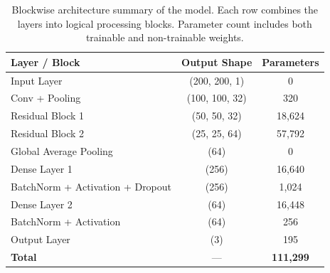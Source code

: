 \begin{table}[H]
\centering
\scriptsize
\begin{tabular}{lcc}
    \toprule
    \textbf{Layer / Block} & \textbf{Output Shape} & \textbf{Parameters} \\
    \midrule
    Input Layer                     & (200, 200, 1)     & 0 \\
    Conv + Pooling                      & (100, 100, 32)    & 320 \\
    Residual Block 1               & (50, 50, 32)      & 18,624 \\
    Residual Block 2               & (25, 25, 64)      & 57,792 \\
    Global Average Pooling         & (64)              & 0 \\
    Dense Layer 1                  & (256)             & 16,640 \\
    BatchNorm + Activation + Dropout & (256)           & 1,024 \\
    Dense Layer 2                  & (64)              & 16,448 \\
    BatchNorm + Activation         & (64)              & 256 \\
    Output Layer                   & (3)               & 195 \\
    \midrule
    \textbf{Total}                 & —                 & \textbf{111,299} \\
    \bottomrule
\end{tabular}
\caption{Blockwise architecture summary of the model. Each row combines the layers into logical processing blocks. Parameter count includes both trainable and non-trainable weights.}
\label{tab:resnet_summary}
\end{table}

